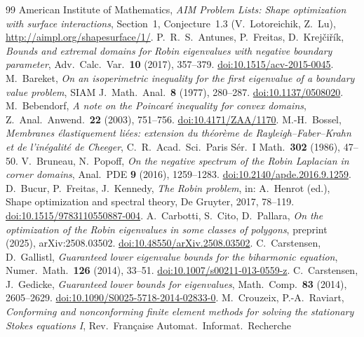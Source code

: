 \documentclass[11pt]{article}
\theoremstyle{remark}
\begin{document}
\raggedright
\begin{thebibliography}{99}
 American Institute of Mathematics, \emph{AIM Problem Lists: Shape optimization with
surface interactions}, Section~1, Conjecture~1.3 (V.~Lotoreichik, Z.~Lu),
\url{http://aimpl.org/shapesurface/1/}.
 P.~R.~S.~Antunes, P.~Freitas, D.~Krej\v{c}i\v{r}\'{i}k, \emph{Bounds and extremal domains
for Robin eigenvalues with negative boundary parameter}, Adv.\ Calc.\ Var.\ \textbf{10} (2017), 357--379.
\href{https://doi.org/10.1515/acv-2015-0045}{doi:10.1515/acv-2015-0045}.
 M.~Bareket, \emph{On an isoperimetric inequality for the first eigenvalue of a boundary
value problem}, SIAM J.\ Math.\ Anal.\ \textbf{8} (1977), 280--287.
\href{https://doi.org/10.1137/0508020}{doi:10.1137/0508020}.
 M.~Bebendorf, \emph{A note on the Poincar\'e inequality for convex domains},
Z.\ Anal.\ Anwend.\ \textbf{22} (2003), 751--756.
\href{https://doi.org/10.4171/ZAA/1170}{doi:10.4171/ZAA/1170}.
 M.-H.~Bossel, \emph{Membranes \'elastiquement li\'ees: extension du th\'eor\`eme
de Rayleigh--Faber--Krahn et de l'in\'egalit\'e de Cheeger}, C.\ R.\ Acad.\ Sci.\ Paris S\'er.\ I Math.\
\textbf{302} (1986), 47--50.
 V.~Bruneau, N.~Popoff, \emph{On the negative spectrum of the Robin Laplacian in corner
domains}, Anal.\ PDE \textbf{9} (2016), 1259--1283.
\href{https://doi.org/10.2140/apde.2016.9.1259}{doi:10.2140/apde.2016.9.1259}.
\bibitem{BFK} D.~Bucur, P.~Freitas, J.~Kennedy, \emph{The Robin problem}, in: A.~Henrot (ed.), Shape
optimization and spectral theory, De Gruyter, 2017, 78--119.
\href{https://doi.org/10.1515/9783110550887-004}{doi:10.1515/9783110550887-004}.
\bibitem{CCP} A.~Carbotti, S.~Cito, D.~Pallara, \emph{On the optimization of the Robin eigenvalues in some
classes of polygons}, preprint (2025), arXiv:2508.03502.
\href{https://doi.org/10.48550/arXiv.2508.03502}{doi:10.48550/arXiv.2508.03502}.
\bibitem{CGal} C.~Carstensen, D.~Gallistl, \emph{Guaranteed lower eigenvalue bounds for the biharmonic
equation}, Numer.\ Math.\ \textbf{126} (2014), 33--51.
\href{https://doi.org/10.1007/s00211-013-0559-z}{doi:10.1007/s00211-013-0559-z}.
\bibitem{CG} C.~Carstensen, J.~Gedicke, \emph{Guaranteed lower bounds for eigenvalues}, Math.\ Comp.\
\textbf{83} (2014), 2605--2629.
\href{https://doi.org/10.1090/S0025-5718-2014-02833-0}{doi:10.1090/S0025-5718-2014-02833-0}.
\bibitem{CR} M.~Crouzeix, P.-A.~Raviart, \emph{Conforming and nonconforming finite element methods for
solving the stationary Stokes equations I}, Rev.\ Fran\c{c}aise Automat.\ Informat.\ Recherche

\end{thebibliography}
\end{document}
